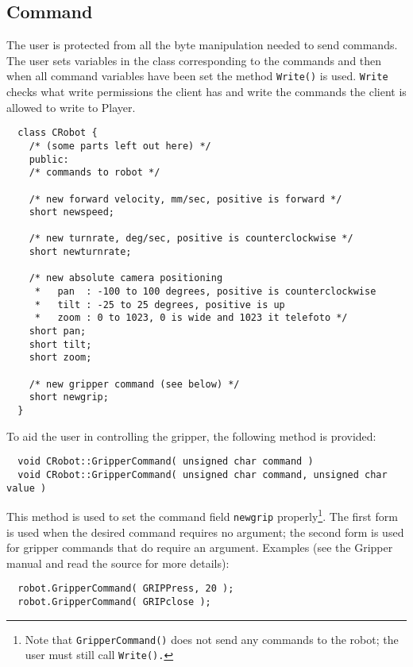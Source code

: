 \documentclass[11pt]{article}
\begin{document}
  
\subsection{Command}

The user is protected from all the byte manipulation needed to send commands.
The user sets variables in the class corresponding to the commands and
then when all command variables have been set the method {\tt Write()} is used. 
{\tt Write} checks what write permissions the client has and write the commands
the client is allowed to write to Player.

\begin{verbatim}
  class CRobot {
    /* (some parts left out here) */
    public:
    /* commands to robot */

    /* new forward velocity, mm/sec, positive is forward */
    short newspeed;

    /* new turnrate, deg/sec, positive is counterclockwise */
    short newturnrate;

    /* new absolute camera positioning
     *   pan  : -100 to 100 degrees, positive is counterclockwise 
     *   tilt : -25 to 25 degrees, positive is up
     *   zoom : 0 to 1023, 0 is wide and 1023 it telefoto */
    short pan;
    short tilt;
    short zoom;

    /* new gripper command (see below) */
    short newgrip;
  }
\end{verbatim}

To aid the user in controlling the gripper, the following method is 
provided:

\begin{verbatim}
  void CRobot::GripperCommand( unsigned char command )
  void CRobot::GripperCommand( unsigned char command, unsigned char value )
\end{verbatim}

This method is used to set the command field {\tt newgrip} 
properly\footnote{Note that {\tt GripperCommand()} does not send
any commands to the robot; the user must still call {\tt Write().}}.  
The first form is used when the desired command requires no argument; 
the second form is used for gripper commands that 
do require an argument.  Examples (see the Gripper manual and read
the source for more details):

\begin{verbatim}
  robot.GripperCommand( GRIPPress, 20 );
  robot.GripperCommand( GRIPclose );
\end{verbatim}
\end{document}
